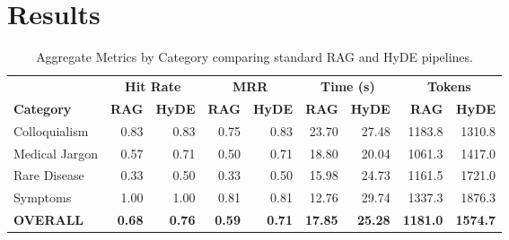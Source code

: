 \section{Results}
\label{sec:results}

\begin{table}[t]
    \centering
    \caption{Aggregate Metrics by Category comparing standard RAG and HyDE pipelines.}
    \label{tab:rag_hyde_metrics}
    \begin{tabular}{l r r r r r r r r}
        \toprule
                          & \multicolumn{2}{c}{\textbf{Hit Rate}} & \multicolumn{2}{c}{\textbf{MRR}} & \multicolumn{2}{c}{\textbf{Time (s)}} & \multicolumn{2}{c}{\textbf{Tokens}}                                                                       \\
        \cmidrule(lr){2-3} \cmidrule(lr){4-5} \cmidrule(lr){6-7} \cmidrule(lr){8-9}
        \textbf{Category} & \textbf{RAG}                          & \textbf{HyDE}                    & \textbf{RAG}                          & \textbf{HyDE}                       & \textbf{RAG}   & \textbf{HyDE}  & \textbf{RAG}    & \textbf{HyDE}   \\
        \midrule
        Colloquialism     & 0.83                                  & 0.83                             & 0.75                                  & 0.83                                & 23.70          & 27.48          & 1183.8          & 1310.8          \\
        Medical Jargon    & 0.57                                  & 0.71                             & 0.50                                  & 0.71                                & 18.80          & 20.04          & 1061.3          & 1417.0          \\
        Rare Disease      & 0.33                                  & 0.50                             & 0.33                                  & 0.50                                & 15.98          & 24.73          & 1161.5          & 1721.0          \\
        Symptoms          & 1.00                                  & 1.00                             & 0.81                                  & 0.81                                & 12.76          & 29.74          & 1337.3          & 1876.3          \\
        \midrule
        \textbf{OVERALL}  & \textbf{0.68}                         & \textbf{0.76}                    & \textbf{0.59}                         & \textbf{0.71}                       & \textbf{17.85} & \textbf{25.28} & \textbf{1181.0} & \textbf{1574.7} \\
        \bottomrule
    \end{tabular}
\end{table}

